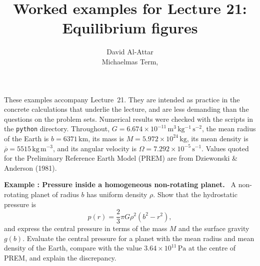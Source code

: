 \documentclass[a4paper,12pt]{paper}
\title{Worked examples for Lecture 21: Equilibrium figures}
\author{David Al-Attar \\ Michaelmas Term, \the\year}
\newcounter{example}
\renewenvironment{example}[1]{%
  \refstepcounter{example}%
  \begin{mdframed}[linewidth=1pt,innertopmargin=6pt,innerbottommargin=6pt]%
  \noindent\textbf{Example \theexample: #1.}\ }{%
  \end{mdframed}}
\begin{document}
\maketitle

\noindent These examples accompany Lecture~21. They are intended as practice in the concrete
calculations that underlie the lecture, and are less demanding than the questions on the
problem sets. Numerical results were checked with the scripts in the \texttt{python}
directory. Throughout, $G=6.674\times10^{-11}\,\mathrm{m^{3}\,kg^{-1}\,s^{-2}}$, the mean radius
of the Earth is $b=6371\,\mathrm{km}$, its mass is $M=5.972\times10^{24}\,\mathrm{kg}$, its
mean density is $\overline{\rho}=5515\,\mathrm{kg\,m^{-3}}$, and its angular velocity is
$\Omega=7.292\times10^{-5}\,\mathrm{s^{-1}}$. Values quoted for the Preliminary Reference Earth
Model (PREM) are from Dziewonski \& Anderson (1981).

\begin{example}{Pressure inside a homogeneous non-rotating planet}
A non-rotating planet of radius $b$ has uniform density $\rho$. Show that the hydrostatic
pressure is
\begin{equation*}
p(r)=\frac{2}{3}\pi G\rho^{2}(b^{2}-r^{2}),
\end{equation*}
and express the central pressure in terms of the mass $M$ and the surface gravity $g(b)$.
Evaluate the central pressure for a planet with the mean radius and mean density of the Earth,
compare with the value $3.64\times10^{11}\,\mathrm{Pa}$ at the centre of PREM, and explain the
discrepancy.
\end{example}
\end{document}
